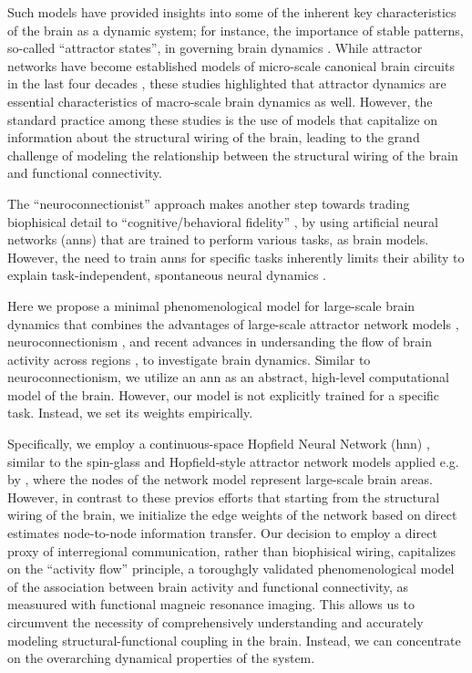 \documentclass{article}
\begin{document}
Such models have provided insights into some of the inherent key characteristics of the brain as a dynamic system; for instance, the importance of stable patterns, so-called ``attractor states'', in governing brain dynamics \citep{deco2012anatomy, golos2015multistability, hansen2015functional}. While attractor networks have become established models of micro-scale canonical brain circuits in the last four decades \citep{khona2022attractor}, these studies highlighted that attractor dynamics are essential characteristics of macro-scale brain dynamics as well. However, the standard practice among these studies is the use of models that capitalize on information about the structural wiring of the brain, leading to the grand challenge of modeling the relationship between the structural wiring of the brain and functional connectivity.

The ``neuroconnectionist'' approach \citep{doerig2023neuroconnectionist} makes another step towards trading biophisical detail to ``cognitive/behavioral fidelity'' \citep{kriegeskorte2018cognitive}, by using artificial neural networks (\acrshort{ann}s) that are trained to perform various tasks, as brain models. However, the need to train \acrshort{ann}s for specific tasks inherently limits their ability to explain task-independent, spontaneous neural dynamics \citep{richards2019deep}.

Here we propose a minimal phenomenological model for large-scale brain dynamics that combines the advantages of large-scale attractor network models \citep{golos2015multistability}, neuroconnectionism \citep{doerig2023neuroconnectionist}, and recent advances in undersanding the flow of brain activity across regions \citep{cole2016activity}, to investigate brain dynamics.
Similar to neuroconnectionism, we utilize an \acrshort{ann} as an abstract, high-level computational model of the brain.
However, our model is not explicitly trained for a specific task. Instead, we set its weights empirically.

Specifically, we employ a continuous-space Hopfield Neural Network (\acrshort{hnn}) \citep{hopfield1982neural, krotov2023new}, similar to the spin-glass and Hopfield-style attractor network models applied e.g. by \citet{deco2012anatomy, golos2015multistability}, where the nodes of the network model represent large-scale brain areas. However, in contrast to these previos efforts that starting from the structural wiring of the brain, we initialize the edge weights of the network based on direct estimates node-to-node information transfer. Our decision to employ a direct proxy of interregional communication, rather than biophisical wiring, capitalizes on the ``activity flow'' \citep{cole2016activity, ito2017cognitive} principle, a toroughgly validated phenomenological model of the association between brain activity and functional connectivity, as measuured with functional magneic resonance imaging.
This allows us to circumvent the necessity of comprehensively understanding and accurately modeling structural-functional coupling in the brain. Instead, we can concentrate on the overarching dynamical properties of the system.
\end{document}

